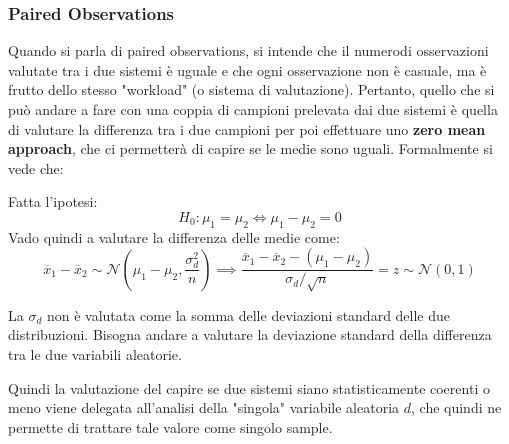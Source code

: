 \subsubsection{Paired Observations}
Quando si parla di paired observations, si intende che il numerodi osservazioni valutate tra i due sistemi è uguale e che ogni osservazione non è casuale, ma è frutto dello stesso "workload" (o sistema di valutazione). Pertanto, quello che si può andare a fare con una coppia di campioni prelevata dai due sistemi è quella di valutare la differenza tra i due campioni per poi effettuare uno \textbf{zero mean approach}, che ci permetterà di capire se le medie sono uguali. Formalmente si vede che:

Fatta l'ipotesi:
\[
H_0: \mu_1 = \mu_2 \iff \mu_1 - \mu_2 = 0
\]
Vado quindi a valutare la differenza delle medie come:
\[
\overline{x}_1 - \overline{x}_2 \sim \mathcal{N}(\mu_1 - \mu_2, \frac{\sigma_d^2}{n}) \implies \frac{\overline{x}_1-\overline{x}_2 - (\mu_1 - \mu_2)}{\sigma_d/\sqrt{n}}=z \sim \mathcal{N}(0,1)
\]
\begin{warn}
La \(\sigma_d\) non è valutata come la somma delle deviazioni standard delle due distribuzioni. Bisogna andare a valutare la deviazione standard della differenza tra le due variabili aleatorie. 
\end{warn}

Quindi la valutazione del capire se due sistemi siano statisticamente coerenti o meno viene delegata all'analisi della "singola" variabile aleatoria \(d\), che quindi ne permette di trattare tale valore come singolo sample.

